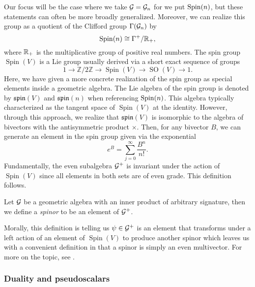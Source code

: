 Our focus will be the case where we take $\mathcal{G}=\mathcal{G}_n$ for we put $\operatorname{Spin}(n)$, but these statements can often be more broadly generalized. Moreover, we can realize this group as a quotient of the Clifford group $\Gamma(\mathcal{G}_n)$ by
\begin{equation}
\operatorname{Spin}(n) \cong \Gamma^+/\mathbb{R}_+,
\end{equation}
where $\mathbb{R}_+$ is the multiplicative group of positive real numbers. The spin group $\operatorname{Spin}(V)$ is a Lie group usually derived via a short exact sequence of groups
\begin{equation}
1 \to \mathbb{Z}/2\mathbb{Z} \to \operatorname{Spin}(V) \to \operatorname{SO}(V) \to 1.
\end{equation}
Here, we have given a more concrete realization of the spin group as special elements inside a geometric algebra. The Lie algebra of the spin group is denoted by $\mathfrak{spin}(V)$ and $\mathfrak{spin}(n)$ when referencing $\operatorname{Spin}(n)$. This algebra typically characterized as the tangent space of $\operatorname{Spin}(V)$ at the identity. However, through this approach, we realize that $\mathfrak{spin}(V)$ is isomorphic to the algebra of bivectors with the antisymmetric product $\times$.  Then, for any bivector $B$, we can generate an element in the spin group given via the exponential
\begin{equation}
e^{B} = \sum_{j=0}^\infty \frac{B^n}{n!}.
\end{equation}
Fundamentally, the even subalgebra $\mathcal{G}^+$ is invariant under the action of $\operatorname{Spin}(V)$ since all elements in both sets are of even grade. This definition follows.
\begin{definition}
Let $\mathcal{G}$ be a geometric algebra with an inner product of arbitrary signature, then we define a \emph{spinor} to be an element of $\mathcal{G}^+$.
\end{definition}
Morally, this definition is telling us $\psi \in \mathcal{G}^+$ is an element that transforms under a left action of an element of $\operatorname{Spin}(V)$ to produce another spinor which leaves us with a convenient definition in that a spinor is simply an even multivector. For more on the topic, see \cite{janssens_special_nodate}.

\subsubsection{Duality and pseudoscalars}
\label{subsubsec:duality_and_pseudoscalars}

